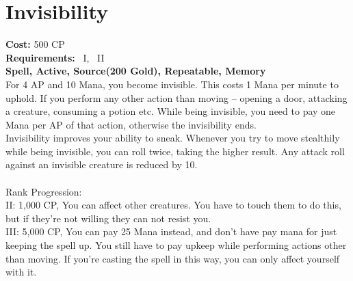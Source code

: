 \section{Invisibility}\label{spell:invisibility}
\textbf{Cost:} 500 CP\\
\textbf{Requirements:}~ I,~ II\\
\textbf{Spell, Active, Source(200 Gold), Repeatable, Memory}\\
For 4 AP and 10 Mana, you become invisible.
This costs 1 Mana per minute to uphold.
If you perform any other action than moving -- opening a door, attacking a creature, consuming a potion etc.
While being invisible, you need to pay one Mana per AP of that action, otherwise the invisibility ends.\\
Invisibility improves your ability to sneak.
Whenever you try to move stealthily while being invisible, you can roll twice, taking the higher result.
Any attack roll against an invisible creature is reduced by 10.\\
\\
Rank Progression:\\
II: 1,000 CP, You can affect other creatures.
You have to touch them to do this, but if they're not willing they can not resist you.\\

III: 5,000 CP, You can pay 25 Mana instead, and don't have pay mana for just keeping the spell up.
You still have to pay upkeep while performing actions other than moving.
If you're casting the spell in this way, you can only affect yourself with it.\\